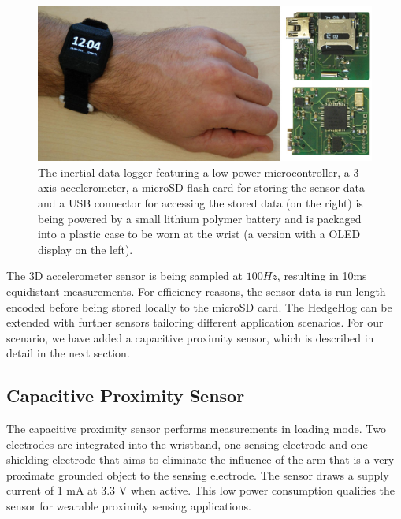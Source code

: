 \documentclass[runningheads,a4paper]{llncs}
\begin{document}
\begin{figure}
	\centering
	\includegraphics[width=\textwidth]{Images/hardware_sensor_2.jpg}
	\caption{The inertial data logger featuring a low-power microcontroller, a 3 axis accelerometer, a microSD flash card for storing the sensor data and a USB connector for accessing the stored data (on the right) is being powered by a small lithium polymer battery and is packaged into a plastic case to be worn at the wrist (a version with a OLED display on the left).}
	\label{fig:sensornode}
\end{figure}

The 3D accelerometer sensor is being sampled at $100Hz$, resulting in 10ms equidistant measurements. For efficiency reasons, the sensor data is run-length encoded before being stored locally to the microSD card. The HedgeHog can be extended with further sensors tailoring different application scenarios. For our scenario, we have added a capacitive proximity sensor, which is described in detail in the next section.

\subsection{Capacitive Proximity Sensor}

The capacitive proximity sensor performs measurements in loading mode. Two electrodes are integrated into the wristband, one sensing electrode and one shielding electrode that aims to eliminate the influence of the arm that is a very proximate grounded object to the sensing electrode. The sensor draws a supply current of 1 mA at 3.3 V when active. This low power consumption qualifies the sensor for wearable proximity sensing applications. 
\end{document}

